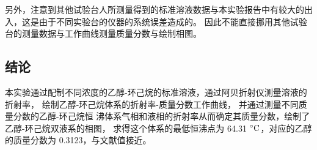 \documentclass[cn,hazy,pku,12pt,normal,math=newtx,cite=super]{elegantnote}
\begin{document}
另外，注意到其他试验台人所测量得到的标准溶液数据与本实验报告中有较大的出入，这是由于不同实验台的仪器的系统误差造成的。
因此不能直接挪用其他试验台的测量数据与工作曲线测量质量分数与绘制相图。


\subsection{结论}

本实验通过配制不同浓度的乙醇-环己烷的标准溶液，通过阿贝折射仪测量溶液的折射率，
绘制乙醇-环己烷体系的折射率-质量分数工作曲线，
并通过测量不同质量分数的乙醇-环己烷恒
沸体系气相和液相的折射率从而确定其质量分数，绘制了乙醇-环己烷双液系的相图，
求得这个体系的最低恒沸点为 64.31 $\rm \degree C$，对应的乙醇的质量分数为 0.3123，与文献值接近。


\nocite{*}

\end{document}
